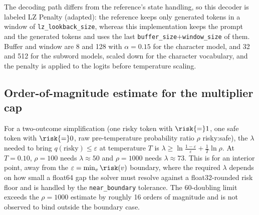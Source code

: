 The decoding path differs from the reference's state handling, so this decoder is labeled LZ Penalty (adapted): the reference keeps only generated tokens in a window of \texttt{lz\_\allowbreak{}lookback\_\allowbreak{}size}, whereas this implementation keeps the prompt and the generated tokens and uses the last \texttt{buffer\_\allowbreak{}size}$+$\texttt{window\_\allowbreak{}size} of them. Buffer and window are 8 and 128 with $\alpha{=}0.15$ for the character model, and 32 and 512 for the subword models, scaled down for the character vocabulary, and the penalty is applied to the logits before temperature scaling.

\subsection{Order-of-magnitude estimate for the multiplier cap}
\label{ssec:lambda-estimate}
\label{app:lambda-estimate}
For a two-outcome simplification (one risky token with $\risk{=}1$, one safe token with $\risk{=}0$, raw pre-temperature probability ratio $\rho$ risky:safe), the $\lambda$ needed to bring $q(\text{risky})\le\varepsilon$ at temperature $T$ is $\lambda\ge\ln\frac{1-\varepsilon}{\varepsilon}+\frac{1}{T}\ln\rho$. At $T{=}0.10$, $\rho{=}100$ needs $\lambda\approx50$ and $\rho{=}1000$ needs $\lambda\approx73$. This is for an interior point, away from the $\varepsilon=\min_v\risk(v)$ boundary, where the required $\lambda$ depends on how small a float64 gap the solver must resolve against a float32-rounded risk floor and is handled by the \texttt{near\_\allowbreak{}boundary} tolerance. The 60-doubling limit exceeds the $\rho{=}1000$ estimate by roughly 16 orders of magnitude and is not observed to bind outside the boundary case.

